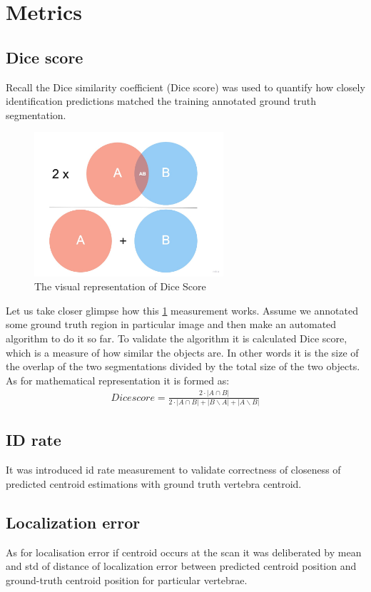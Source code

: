 \section{Metrics}
\subsection{Dice score}
Recall the \cite{Thada2013} Dice similarity coefficient (Dice score) was used to quantify how closely identification predictions matched the training annotated ground truth segmentation. 

\begin{figure}[h]
    \centering \includegraphics[width=7cm]{images/dice_score.jpg}
    \caption {The visual representation of Dice Score}
    \label{fig:dice_score}
\end{figure}

Let us take closer glimpse how this \ref{fig:dice_score} measurement works. Assume we annotated some ground truth region in particular image and then make an automated algorithm to do it so far. To validate the algorithm it is calculated Dice score, which is a measure of how similar the objects are. In other words it is the size of the overlap of the two segmentations divided by the total size of the two objects. As for mathematical representation it is formed as:
\begin{align*}
  Dice score = \frac{2\cdot|A\cap B|}{2\cdot|A\cap B| + |B\backslash A| + |A\backslash B|}
\end{align*}

\subsection{ID rate}
It was introduced id rate measurement to validate correctness of closeness of predicted centroid estimations with ground truth vertebra centroid. 

\subsection{Localization error}
As for localisation error if centroid occurs at the scan it was deliberated by mean and std of distance of localization error between predicted centroid position and ground-truth centroid position for particular vertebrae. 


